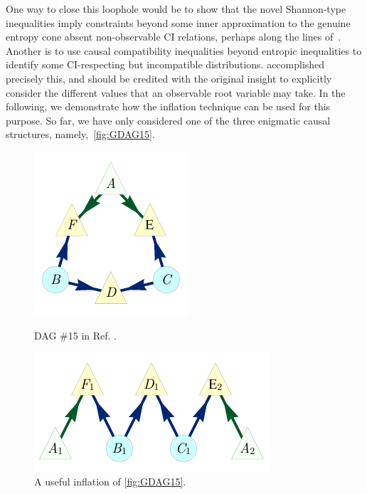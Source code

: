 \documentclass[aps,english,superscriptaddress,onecolumn,twoside,longbibliography,pra,floatfix,fleqn,nofootinbib]{revtex4-1}%
\theoremstyle{definition}
\begin{document}
One way to close this loophole would be to show that the novel Shannon-type inequalities imply constraints beyond some inner approximation to the genuine entropy cone absent non-observable CI relations, perhaps along the lines of~\cite{weilenmann2016entropic}. Another is to use causal compatibility inequalities beyond entropic inequalities to identify some CI-respecting but incompatible distributions. \citet{pianaar2016interesting} accomplished precisely this, and should be credited with the original insight to explicitly consider the different values that an observable root variable may take. In the following, we demonstrate how the inflation technique can be used for this purpose. So far, we have only considered one of the three enigmatic causal structures, namely,~\cref{fig:GDAG15}.

\begin{figure}[b]
\centering
\begin{minipage}[t]{0.4\linewidth}
\centering
\includegraphics[scale=1]{scen15DAGV2.pdf}
\caption{DAG \#15 in Ref. \cite{pusey2014gdag}.}\label{fig:GDAG15}
\end{minipage}
\hfill
\begin{minipage}[t]{0.5\linewidth}
\centering
\includegraphics[scale=1]{scen15InflationDAGV2.pdf}
\caption{A useful inflation of \cref{fig:GDAG15}.}\label{fig:Inflated15}
\end{minipage}
\end{figure}
\end{document}
